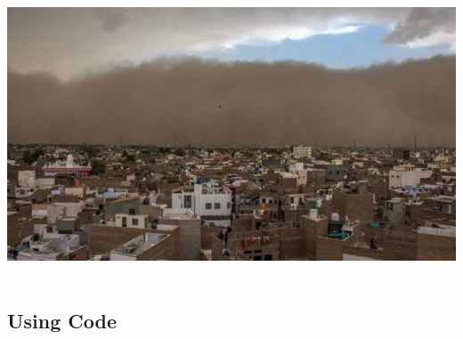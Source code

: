 \documentclass[float=false,crop=false]{standalone}
\begin{document}
    \includegraphics{ipy_sample_files/attach_5_image.png} ~

    \subsection{Using Code}\label{using-code}
\end{document}

